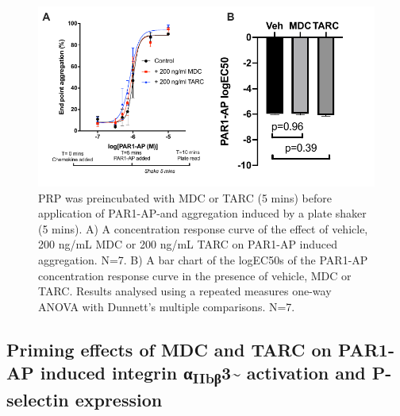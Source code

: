 \documentclass[11pt,twoside]{bristolthesis}
\begin{document}
\begin{figure}
\includegraphics{figure/Chemokines/Layouts/MDC_TARC_PRP_plate_agg} \caption[The priming effect of the chemokines MDC and TARC on PAR1-AP induced platelet aggregation in PRP using plate aggregation]{PRP was preincubated with MDC or TARC (5 mins) before application of PAR1-AP-and aggregation induced by a plate shaker (5 mins). A) A concentration response curve of the effect of vehicle, 200 ng/mL MDC or 200 ng/mL TARC on PAR1-AP induced aggregation. N=7. B) A bar chart of the logEC50s of the PAR1-AP concentration response curve in the presence of vehicle, MDC or TARC. Results analysed using a repeated measures one-way ANOVA with Dunnett's multiple comparisons. N=7.}\label{fig:MDC-TARC-agg-PRP}
\end{figure}
\hypertarget{priming-effects-of-mdc-and-tarc-on-par1-ap-induced-integrin-ux3b1iibux3b23-activation-and-p-selectin-expression}{%
\subsection{\texorpdfstring{Priming effects of MDC and TARC on PAR1-AP induced integrin α\textsubscript{IIbβ}3\textasciitilde{} activation and P-selectin expression}{Priming effects of MDC and TARC on PAR1-AP induced integrin αIIbβ3\textasciitilde{} activation and P-selectin expression}}\label{priming-effects-of-mdc-and-tarc-on-par1-ap-induced-integrin-ux3b1iibux3b23-activation-and-p-selectin-expression}}
\end{document}
